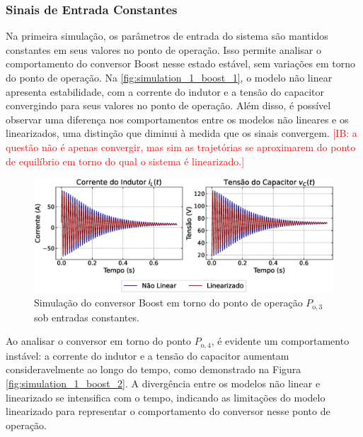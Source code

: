 \subsubsection{Sinais de Entrada Constantes}

Na primeira simulação, os parâmetros de entrada do sistema são mantidos constantes em seus valores no ponto de operação. Isso permite analisar o comportamento do conversor Boost nesse estado estável, sem variações em torno do ponto de operação. Na \autoref{fig:simulation_1_boost_1}, o modelo não linear apresenta estabilidade, com a corrente do indutor e a tensão do capacitor convergindo para seus valores no ponto de operação. Além disso, é possível observar uma diferença nos comportamentos entre os modelos não lineares e os linearizados, uma distinção que diminui à medida que os sinais convergem. \textcolor{red}{[IB: a questão não é apenas convergir, mas sim as trajetórias se aproximarem do ponto de equilíbrio em torno do qual o sistema é linearizado.]}

\begin{figure}[H]
  \centering
  \captionsetup{justification=centering}
  \includegraphics[width=1.\textwidth]{figuras/boost/sim1/op1/result.eps}
  \caption{Simulação do conversor Boost em torno do ponto de operação $P_{\mathrm{o}, 3}$ sob entradas constantes.}
  \label{fig:simulation_1_boost_1}
\end{figure}

Ao analisar o conversor em torno do ponto $P_{\mathrm{o}, 4}$, é evidente um comportamento instável: a corrente do indutor e a tensão do capacitor aumentam consideravelmente ao longo do tempo, como demonstrado na Figura \ref{fig:simulation_1_boost_2}. A divergência entre os modelos não linear e linearizado se intensifica com o tempo, indicando as limitações do modelo linearizado para representar o comportamento do conversor nesse ponto de operação.

